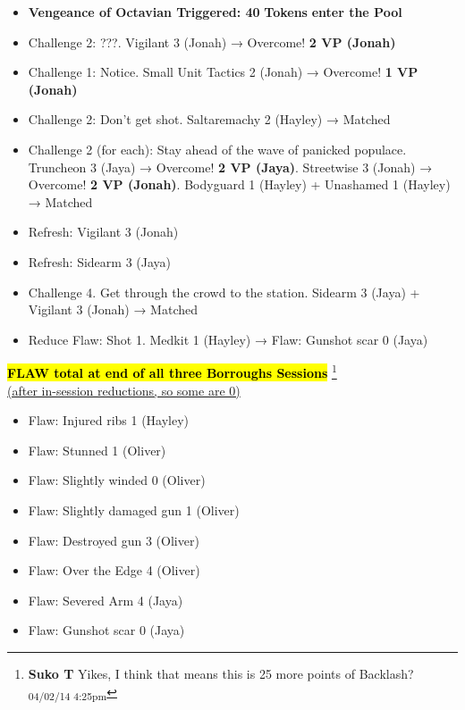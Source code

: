\begin{itemize}
\item \textbf{Vengeance of Octavian Triggered: 40}\textbf{ Tokens}\textbf{ enter the Pool}
\item Challenge 2: ???.  Vigilant 3 (Jonah)  → Overcome! \textbf{2 VP (Jonah)}
\item Challenge 1: Notice.  Small Unit Tactics 2 (Jonah)  → Overcome! \textbf{1 VP (Jonah)}
\item Challenge 2: Don't get shot.  Saltaremachy 2 (Hayley) → Matched
\item Challenge 2 (for each): Stay ahead of the wave of panicked populace.   Truncheon 3 (Jaya)  → Overcome! \textbf{2 VP (Jaya)}.  Streetwise 3  (Jonah) → Overcome! \textbf{2 VP (Jonah)}. Bodyguard 1 (Hayley) + Unashamed 1 (Hayley)  → Matched
\item Refresh: Vigilant 3 (Jonah)
\item Refresh: Sidearm 3 (Jaya)
\item Challenge 4.  Get through the crowd to the station.  Sidearm 3 (Jaya) + Vigilant 3 (Jonah)  → Matched
\item Reduce Flaw: Shot 1.  Medkit 1 (Hayley) →   {\color[RGB]{255,0,0}Flaw: Gunshot scar 0 (Jaya)} 
\end{itemize}




\textbf{\hl{FLAW total at end of all three Borroughs Sessions} }\footnote{\textbf{Suko T }Yikes, I think that means this is 25 more points of Backlash? \textsubscript{04/02/14 4:25pm}}\\
\underline{   (after in-session reductions, so some are 0) }

\begin{itemize}
\item  {\color[RGB]{255,0,0}Flaw: Injured ribs 1 (Hayley)} 
\item  {\color[RGB]{255,0,0}Flaw: Stunned 1 (Oliver)} 
\item  {\color[RGB]{255,0,0}Flaw: Slightly winded 0 (Oliver)} 
\item  {\color[RGB]{255,0,0}Flaw: Slightly damaged gun 1 (Oliver)} 
\item  {\color[RGB]{255,0,0}Flaw: Destroyed gun 3 (Oliver)} 
\item  {\color[RGB]{255,0,0}Flaw: Over the Edge 4 (Oliver)} 
\item  {\color[RGB]{255,0,0}Flaw: Severed Arm 4 (Jaya)} 
\item  {\color[RGB]{255,0,0}Flaw: Gunshot scar 0 (Jaya)} 
\end{itemize}





